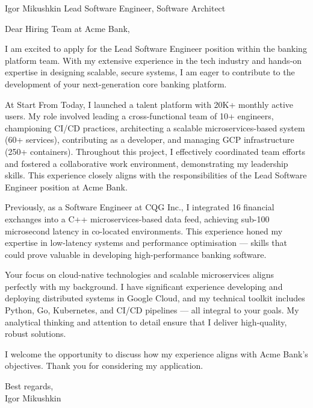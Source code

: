\documentclass[9pt,a4paper]{juicv}
\begin{document}
\begin{paracol}{2}
\cvMakeHeader
    {Igor Mikushkin}
    {}
    {Lead Software Engineer, Software Architect}

\vspace{3pt}
\setlength{\parskip}{0.7em}
Dear Hiring Team at Acme Bank,

I am excited to apply for the Lead Software Engineer position within the banking platform team.
With my extensive experience in the tech industry
and hands-on expertise in designing scalable, secure systems,
I am eager to contribute to the development of your next-generation core banking platform.

At Start From Today, I launched a talent platform with 20K+ monthly active users.
My role involved leading a cross-functional team of 10+ engineers, championing CI/CD practices,
architecting a scalable microservices-based system (60+ services),
contributing as a developer, and managing GCP infrastructure (250+ containers).
Throughout this project, I effectively coordinated team efforts
and fostered a collaborative work environment, demonstrating my leadership skills.
This experience closely aligns with the responsibilities of the Lead Software Engineer position at Acme Bank.

Previously, as a Software Engineer at CQG Inc.,
I integrated 16 financial exchanges into a C++ microservices-based data feed,
achieving sub-100 microsecond latency in co-located environments.
This experience honed my expertise in low-latency systems and performance optimisation
--- skills that could prove valuable in developing high-performance banking software.

Your focus on cloud-native technologies and scalable microservices aligns perfectly with my background.
I have significant experience developing and deploying distributed systems in Google Cloud,
and my technical toolkit includes Python, Go, Kubernetes, and CI/CD pipelines --- all integral to your goals.
My analytical thinking and attention to detail ensure that I deliver high-quality, robust solutions.

I welcome the opportunity to discuss how my experience aligns with Acme Bank's objectives.
Thank you for considering my application.

\vspace{12pt}
Best regards,\\
Igor Mikushkin

\newpage
\switchcolumn
\raggedright
\setlength{\parskip}{0em}


\end{paracol}
\end{document}
